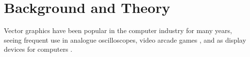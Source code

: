 \chapter{Background and Theory}

Vector graphics have been popular in the computer industry for many years, seeing frequent use in analogue oscilloscopes, video arcade games \cite{astroids}, and as display devices for computers \cite{ibm2250}.



